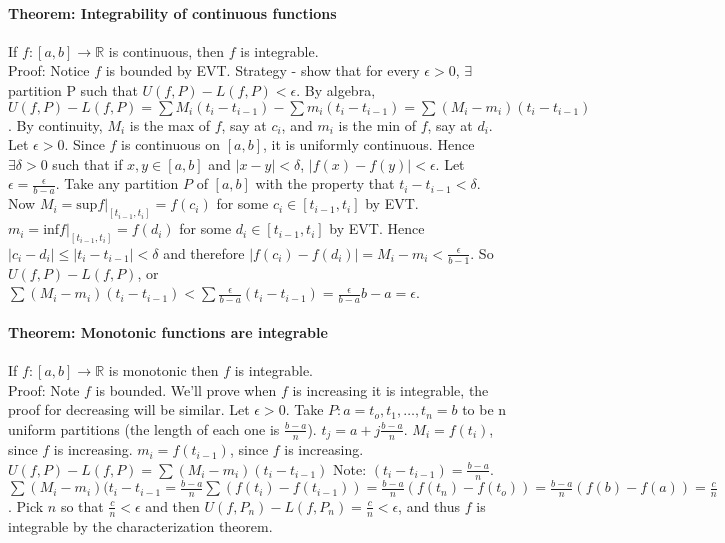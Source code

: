 \documentclass[10pt,letter]{article}
\begin{document}
\paragraph{Theorem: Integrability of continuous functions}
If $f:[a,b]\rightarrow\mathbb{R}$ is continuous, then $f$ is integrable. \\ 
Proof: Notice $f$ is bounded by EVT. Strategy - show that for every $\epsilon>0$, $\exists$ partition P such that $U(f,P)-L(f,P)<\epsilon$. By algebra, $U(f,P)-L(f,P)=\sum M_i(t_i-t_{i-1})-\sum m_i(t_i-t_{i-1})=\sum (M_i-m_i)(t_i-t_{i-1})$. By continuity, $M_i$ is the max of $f$, say at $c_i$, and $m_i$ is the min of $f$, say at $d_i$. \\ 
Let $\epsilon>0$. Since $f$ is continuous on $[a,b]$, it is uniformly continuous. Hence $\exists\delta>0$ such that if $x,y\in[a,b]$ and $|x-y|<\delta$, $|f(x)-f(y)|<\epsilon$. Let $\epsilon=\frac{\epsilon}{b-a}$. Take any partition $P$ of $[a,b]$ with the property that $t_i-t_{i-1}<\delta$. Now $M_i=\text{sup}f|_{[t_{i-1},t_i]}=f(c_i)$ for some $c_i\in[t_{i-1},t_i]$ by EVT. $m_i=\text{inf}f|_{[t_{i-1},t_i]}=f(d_i)$ for some $d_i\in[t_{i-1},t_i]$ by EVT. Hence $|c_i-d_i|\leq|t_i-t_{i-1}|<\delta$ and therefore $|f(c_i)-f(d_i)|=M_i-m_i<\frac{\epsilon}{b-1}$. So $U(f,P)-L(f,P)$, or $\sum (M_i-m_i)(t_i-t_{i-1})<\sum \frac{\epsilon}{b-a}(t_i-t_{i-1})=\frac{\epsilon}{b-a}{b-a}=\epsilon$.


\paragraph{Theorem: Monotonic functions are integrable}
If $f:[a,b]\rightarrow\mathbb{R}$ is monotonic then $f$ is integrable. \\ 
Proof: Note $f$ is bounded. We'll prove when $f$ is increasing it is integrable, the proof for decreasing will be similar. Let $\epsilon>0$. Take $P:a=t_o,t_1,\ldots,t_n=b$ to be n uniform partitions (the length of each one is $\frac{b-a}{n}$). $t_j=a+j\frac{b-a}{n}$. $M_i=f(t_i)$, since $f$ is increasing. $m_i=f(t_{i-1})$, since $f$ is increasing. $U(f,P)-L(f,P) =\sum (M_i-m_i)(t_i-t_{i-1})$ Note: $(t_i-t_{i-1})=\frac{b-a}{n}$. $\sum (M_i-m_i)(t_i-t_{i-1}=\frac{b-a}{n}\sum(f(t_i)-f(t_{i-1}))=\frac{b-a}{n}(f(t_n)-f(t_o))=\frac{b-a}{n}(f(b)-f(a))=\frac{c}{n}$. Pick $n$ so that $\frac{c}{n}<\epsilon$ and then $U(f,P_n)-L(f,P_n)=\frac{c}{n}<\epsilon$, and thus $f$ is integrable by the characterization theorem.  
\end{document}
